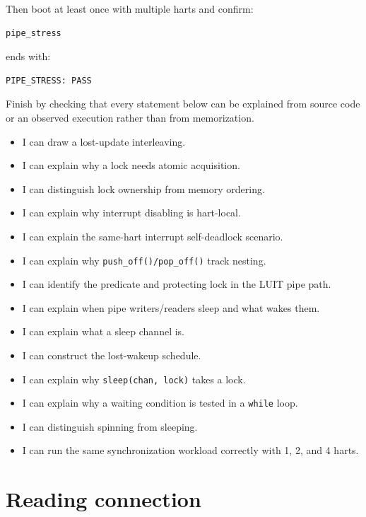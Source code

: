 \documentclass[11pt,a4paper]{article}
\newcommand{\file}[1]{\texttt{#1}}
\begin{document}
Then boot at least once with multiple harts and confirm:

\begin{lstlisting}
pipe_stress
\end{lstlisting}

ends with:

\begin{lstlisting}
PIPE_STRESS: PASS
\end{lstlisting}

Finish by checking that every statement below can be explained from source code or an observed execution rather than from memorization.

\begin{itemize}[leftmargin=7mm]
\item[$\square$] I can draw a lost-update interleaving.
\item[$\square$] I can explain why a lock needs atomic acquisition.
\item[$\square$] I can distinguish lock ownership from memory ordering.
\item[$\square$] I can explain why interrupt disabling is hart-local.
\item[$\square$] I can explain the same-hart interrupt self-deadlock scenario.
\item[$\square$] I can explain why \file{push\_off()/pop\_off()} track nesting.
\item[$\square$] I can identify the predicate and protecting lock in the LUIT pipe path.
\item[$\square$] I can explain when pipe writers/readers sleep and what wakes them.
\item[$\square$] I can explain what a sleep channel is.
\item[$\square$] I can construct the lost-wakeup schedule.
\item[$\square$] I can explain why \file{sleep(chan, lock)} takes a lock.
\item[$\square$] I can explain why a waiting condition is tested in a \file{while} loop.
\item[$\square$] I can distinguish spinning from sleeping.
\item[$\square$] I can run the same synchronization workload correctly with 1, 2, and 4 harts.
\end{itemize}

\section*{Reading connection}
\end{document}
